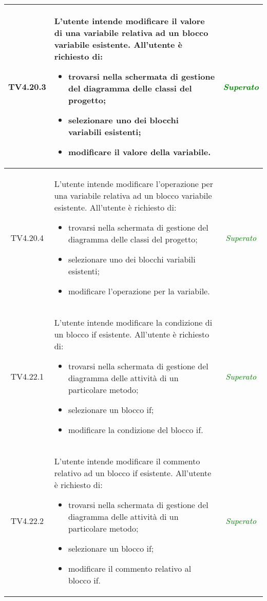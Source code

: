 \begin{longtable}{|c|>{}m{8cm}|c|}
\hypertarget{TV4.20.3}{TV4.20.3} & L'utente intende modificare il valore di una variabile relativa ad un blocco variabile esistente.
All'utente è richiesto di:
\begin{itemize}
	\item trovarsi nella schermata di gestione del diagramma delle classi del progetto;
	\item selezionare uno dei blocchi variabili esistenti;
	\item modificare il valore della variabile.
\end{itemize} & \textcolor{Green}{\textit{Superato}}\\ \hline

\hypertarget{TV4.20.4}{TV4.20.4} & L'utente intende modificare l'operazione per una variabile relativa ad un blocco variabile esistente.
All'utente è richiesto di:
\begin{itemize}
	\item trovarsi nella schermata di gestione del diagramma delle classi del progetto;
	\item selezionare uno dei blocchi variabili esistenti;
	\item modificare l'operazione per la variabile.
\end{itemize} & \textcolor{Green}{\textit{Superato}}\\ \hline

\hypertarget{TV4.22.1}{TV4.22.1} & L'utente intende modificare la condizione di un blocco if esistente.
All'utente è richiesto di:
\begin{itemize}
	\item trovarsi nella schermata di gestione del diagramma delle attività di un particolare metodo;
	\item selezionare un blocco if;
	\item modificare la condizione del blocco if.
\end{itemize} & \textcolor{Green}{\textit{Superato}}\\ \hline

\hypertarget{TV4.22.2}{TV4.22.2} & L'utente intende modificare il commento relativo ad un blocco if esistente.
All'utente è richiesto di:
\begin{itemize}
	\item trovarsi nella schermata di gestione del diagramma delle attività di un particolare metodo;
	\item selezionare un blocco if;
	\item modificare il commento relativo al blocco if.
\end{itemize} & \textcolor{Green}{\textit{Superato}}\\ \hline


\end{longtable}
